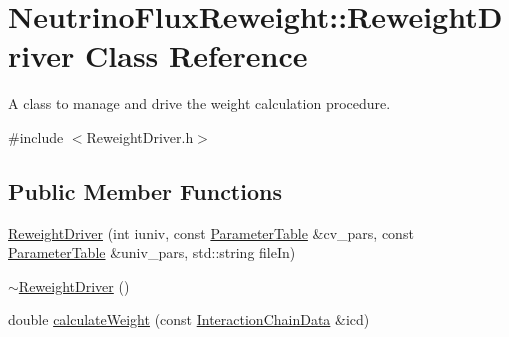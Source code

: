 \hypertarget{class_neutrino_flux_reweight_1_1_reweight_driver}{\section{Neutrino\-Flux\-Reweight\-:\-:Reweight\-Driver Class Reference}
\label{class_neutrino_flux_reweight_1_1_reweight_driver}
}


A class to manage and drive the weight calculation procedure.  




{\ttfamily \#include $<$Reweight\-Driver.\-h$>$}

\subsection*{Public Member Functions}
\begin{DoxyCompactItemize}
\item 
\hyperlink{class_neutrino_flux_reweight_1_1_reweight_driver_aace1af87b443944748ce31117dee56bc}{Reweight\-Driver} (int iuniv, const \hyperlink{class_neutrino_flux_reweight_1_1_parameter_table}{Parameter\-Table} \&cv\-\_\-pars, const \hyperlink{class_neutrino_flux_reweight_1_1_parameter_table}{Parameter\-Table} \&univ\-\_\-pars, std\-::string file\-In)
\item 
\hyperlink{class_neutrino_flux_reweight_1_1_reweight_driver_af2ff6248924fc055cea8cd8a01b138c1}{$\sim$\-Reweight\-Driver} ()
\item 
double \hyperlink{class_neutrino_flux_reweight_1_1_reweight_driver_a72100a0c4d71b779936667a52765064e}{calculate\-Weight} (const \hyperlink{class_neutrino_flux_reweight_1_1_interaction_chain_data}{Interaction\-Chain\-Data} \&icd)
\end{DoxyCompactItemize}
